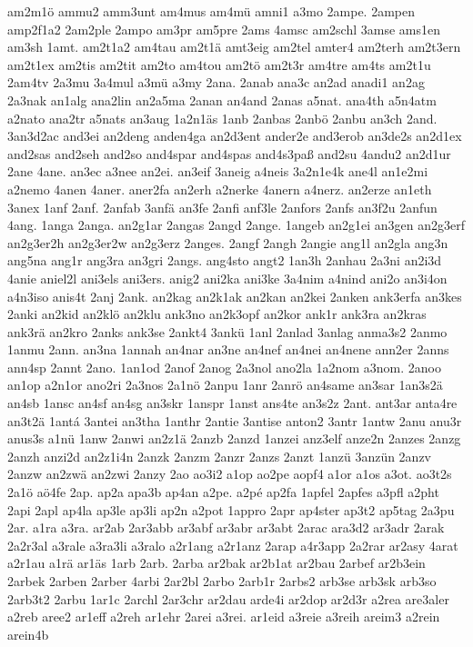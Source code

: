 {am2m1ö
ammu2
amm3unt
am4mus
am4mü
amni1
a3mo
2ampe.
2ampen
amp2f1a2
2am2ple
2ampo
am3pr
am5pre
2ams
4amsc
am2schl
3amse
ams1en
am3sh
1amt.
am2t1a2
am4tau
am2t1ä
amt3eig
am2tel
amter4
am2terh
am2t3ern
am2t1ex
am2tis
am2tit
am2to
am4tou
am2tö
am2t3r
am4tre
am4ts
am2t1u
2am4tv
2a3mu
3a4mul
a3mü
a3my
2ana.
2anab
ana3c
an2ad
anadi1
an2ag
2a3nak
an1alg
ana2lin
an2a5ma
2anan
an4and
2anas
a5nat.
ana4th
a5n4atm
a2nato
ana2tr
a5nats
an3aug
1a2n1äs
1anb
2anbas
2anbö
2anbu
an3ch
2and.
3an3d2ac
and3ei
an2deng
anden4ga
an2d3ent
ander2e
and3erob
an3de2s
an2d1ex
and2sas
and2seh
and2so
and4spar
and4spas
and4s3paß
and2su
4andu2
an2d1ur
2ane
4ane.
an3ec
a3nee
an2ei.
an3eif
3aneig
a4neis
3a2n1e4k
ane4l
an1e2mi
a2nemo
4anen
4aner.
aner2fa
an2erh
a2nerke
4anern
a4nerz.
an2erze
an1eth
3anex
1anf
2anf.
2anfab
3anfä
an3fe
2anfi
anf3le
2anfors
2anfs
an3f2u
2anfun
4ang.
1anga
2anga.
an2g1ar
2angas
2angd
2ange.
1angeb
an2g1ei
an3gen
an2g3erf
an2g3er2h
an2g3er2w
an2g3erz
2anges.
2angf
2angh
2angie
ang1l
an2gla
ang3n
ang5na
ang1r
ang3ra
an3gri
2angs.
ang4sto
angt2
1an3h
2anhau
2a3ni
an2i3d
4anie
aniel2l
ani3els
ani3ers.
anig2
ani2ka
ani3ke
3a4nim
a4nind
ani2o
an3i4on
a4n3iso
anis4t
2anj
2ank.
an2kag
an2k1ak
an2kan
an2kei
2anken
ank3erfa
an3kes
2anki
an2kid
an2klö
an2klu
ank3no
an2k3opf
an2kor
ank1r
ank3ra
an2kras
ank3rä
an2kro
2anks
ank3se
2ankt4
3ankü
1anl
2anlad
3anlag
anma3s2
2anmo
1anmu
2ann.
an3na
1annah
an4nar
an3ne
an4nef
an4nei
an4nene
ann2er
2anns
ann4sp
2annt
2ano.
1an1od
2anof
2anog
2a3nol
ano2la
1a2nom
a3nom.
2anoo
an1op
a2n1or
ano2ri
2a3nos
2a1nö
2anpu
1anr
2anrö
an4same
an3sar
1an3s2ä
an4sb
1ansc
an4sf
an4sg
an3skr
1anspr
1anst
ans4te
an3s2z
2ant.
ant3ar
anta4re
an3t2ä
1antá
3antei
an3tha
1anthr
2antie
3antise
anton2
3antr
1antw
2anu
anu3r
anus3s
a1nü
1anw
2anwi
an2z1ä
2anzb
2anzd
1anzei
anz3elf
anze2n
2anzes
2anzg
2anzh
anzi2d
an2z1i4n
2anzk
2anzm
2anzr
2anzs
2anzt
1anzü
3anzün
2anzv
2anzw
an2zwä
an2zwi
2anzy
2ao
ao3i2
a1op
ao2pe
aopf4
a1or
a1os
a3ot.
ao3t2s
2a1ö
aö4fe
2ap.
ap2a
apa3b
ap4an
a2pe.
a2pé
ap2fa
1apfel
2apfes
a3pfl
a2pht
2api
2apl
ap4la
ap3le
ap3li
ap2n
a2pot
1appro
2apr
ap4ster
ap3t2
ap5tag
2a3pu
2ar.
a1ra
a3ra.
ar2ab
2ar3abb
ar3abf
ar3abr
ar3abt
2arac
ara3d2
ar3adr
2arak
2a2r3al
a3rale
a3ra3li
a3ralo
a2r1ang
a2r1anz
2arap
a4r3app
2a2rar
ar2asy
4arat
a2r1au
a1rä
ar1äs
1arb
2arb.
2arba
ar2bak
ar2b1at
ar2bau
2arbef
ar2b3ein
2arbek
2arben
2arber
4arbi
2ar2bl
2arbo
2arb1r
2arbs2
arb3se
arb3sk
arb3so
2arb3t2
2arbu
1ar1c
2archl
2ar3chr
ar2dau
arde4i
ar2dop
ar2d3r
a2rea
are3aler
a2reb
aree2
ar1eff
a2reh
ar1ehr
2arei
a3rei.
ar1eid
a3reie
a3reih
areim3
a2rein
arein4b
}
